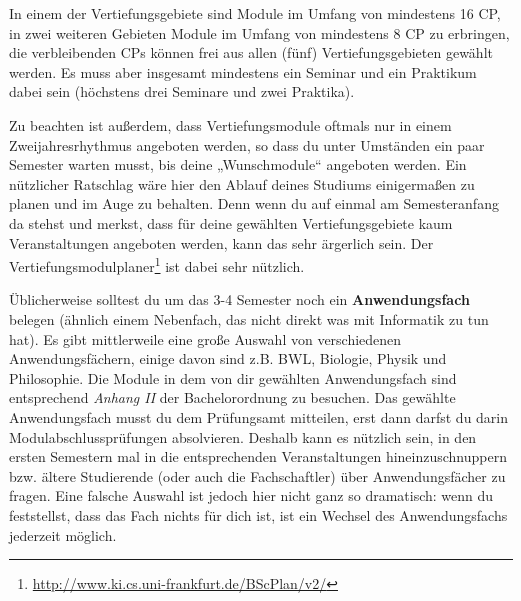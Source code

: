 In einem der Vertiefungsgebiete sind Module im Umfang von mindestens 16 CP, in zwei weiteren Gebieten Module im Umfang von mindestens 8 CP zu erbringen, die verbleibenden CPs können frei aus allen (fünf) Vertiefungsgebieten gewählt werden. Es muss aber insgesamt mindestens ein Seminar und ein Praktikum dabei sein (höchstens drei Seminare und zwei Praktika).


Zu beachten ist außerdem, dass Vertiefungsmodule oftmals nur in einem Zweijahresrhythmus angeboten werden, so dass du unter Umständen ein paar Semester warten musst, bis deine „Wunschmodule“ angeboten werden. Ein nützlicher Ratschlag wäre hier den Ablauf deines Studiums einigermaßen zu planen und im Auge zu behalten. Denn wenn du auf einmal am Semesteranfang da stehst und merkst, dass für deine gewählten Vertiefungsgebiete kaum Veranstaltungen angeboten werden, kann das sehr ärgerlich sein. Der Vertiefungsmodulplaner\footnote{\href{http://www.ki.cs.uni-frankfurt.de/BScPlan/v2/}{http://www.ki.cs.uni-frankfurt.de/BScPlan/v2/}} ist dabei sehr nützlich.

Üblicherweise solltest du um das 3-4 Semester noch ein \textbf{Anwendungsfach} belegen (ähnlich einem Nebenfach, das nicht direkt was mit Informatik zu tun hat). Es gibt mittlerweile eine große Auswahl von verschiedenen Anwendungsfächern, einige davon sind z.B. BWL, Biologie, Physik und Philosophie. Die Module in dem von dir gewählten Anwendungsfach sind entsprechend \emph{Anhang II} der Bachelorordnung zu besuchen. Das gewählte Anwendungsfach musst du dem Prüfungsamt mitteilen, erst dann darfst du darin Modulabschlussprüfungen absolvieren. Deshalb kann es nützlich sein, in den ersten Semestern mal in die entsprechenden Veranstaltungen hineinzuschnuppern bzw. ältere Studierende (oder auch die Fachschaftler) über Anwendungsfächer zu fragen. Eine falsche Auswahl ist jedoch hier nicht ganz so dramatisch: wenn du feststellst, dass das Fach nichts für dich ist, ist ein Wechsel des Anwendungsfachs jederzeit möglich.

